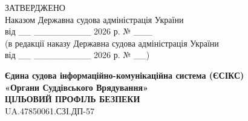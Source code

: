 \documentclass[10pt]{article}
\begin{document}
\begin{flushright}
ЗАТВЕРДЖЕНО\\
Наказом Державна судова адміністрація України\\
від \_\_ \_\_\_\_\_\_\_\_\_ 2026 р. № \_\_\_\\
(в редакції наказу Державна судова адміністрація України\\
від \_\_ \_\_\_\_\_\_\_\_\_ 2026 р. № \_\_)
\end{flushright}

\vspace{2cm}

\begin{center}
\textbf{\Large Єдина судова інформаційно-комунікаційна система (ЄСІКС)}\\
\textbf{\Large «Органи Суддівського Врядування»}\\
\vspace{1cm}
\textbf{\Large ЦІЛЬОВИЙ ПРОФІЛЬ БЕЗПЕКИ}\\
\vspace{0.5cm}
\large UA.47850061.СЗІ.ДП-57
\end{center}

\newpage
\end{document}
